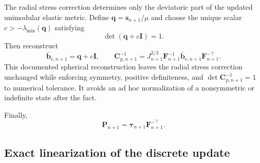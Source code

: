 \documentclass[11pt,a4paper]{article}
\newcommand{\bs}[1]{\boldsymbol{#1}}
\newcommand{\I}{\bs{I}}
\newcommand{\F}{\bs{F}}
\newcommand{\Pstress}{\bs{P}}
\newcommand{\tauK}{\bs{\tau}}
\begin{document}
The radial stress correction determines only the deviatoric part of the updated unimodular elastic metric.  Define $\bs q=\bs s_{n+1}/\mu$ and choose the unique scalar $c>-\lambda_{\min}(\bs q)$ satisfying
\begin{equation}
\det(\bs q+c\I)=1.
\label{eq:j2-unimodular-root}
\end{equation}
Then reconstruct
\begin{equation}
\bar{\bs b}_{\mathrm e,n+1}=\bs q+c\I,
\qquad
\bs C_{\mathrm p,n+1}^{-1}
=J_{n+1}^{2/3}\F_{n+1}^{-1}
\bar{\bs b}_{\mathrm e,n+1}\F_{n+1}^{-\top}.
\label{eq:j2-state-reconstruction}
\end{equation}
This documented spherical reconstruction leaves the radial stress correction unchanged while enforcing symmetry, positive definiteness, and $\det\bs C_{\mathrm p,n+1}^{-1}=1$ to numerical tolerance.  It avoids an ad hoc normalization of a nonsymmetric or indefinite state after the fact.

Finally,
\begin{equation}
\Pstress_{n+1}=\tauK_{n+1}\F_{n+1}^{-\top}.
\end{equation}

\subsection{Exact linearization of the discrete update}
\end{document}
